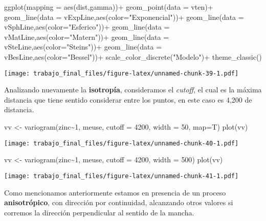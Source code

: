 \documentclass[
  12pt,
]{article}
\newenvironment{Shaded}{\begin{snugshade}}{\end{snugshade}}
\newcommand{\AttributeTok}[1]{\textcolor[rgb]{0.77,0.63,0.00}{#1}}
\newcommand{\DecValTok}[1]{\textcolor[rgb]{0.00,0.00,0.81}{#1}}
\newcommand{\FunctionTok}[1]{\textcolor[rgb]{0.00,0.00,0.00}{#1}}
\newcommand{\NormalTok}[1]{#1}
\newcommand{\OtherTok}[1]{\textcolor[rgb]{0.56,0.35,0.01}{#1}}
\newcommand{\SpecialCharTok}[1]{\textcolor[rgb]{0.00,0.00,0.00}{#1}}
\newcommand{\StringTok}[1]{\textcolor[rgb]{0.31,0.60,0.02}{#1}}
\begin{document}
\begin{Shaded}
\begin{Highlighting}[]
\FunctionTok{ggplot}\NormalTok{(}\AttributeTok{mapping =} \FunctionTok{aes}\NormalTok{(dist,gamma))}\SpecialCharTok{+}
  \FunctionTok{geom\_point}\NormalTok{(}\AttributeTok{data =}\NormalTok{ vten)}\SpecialCharTok{+}
  \FunctionTok{geom\_line}\NormalTok{(}\AttributeTok{data =}\NormalTok{ vExpLine,}\FunctionTok{aes}\NormalTok{(}\AttributeTok{color=}\StringTok{"Exponencial"}\NormalTok{))}\SpecialCharTok{+}
  \FunctionTok{geom\_line}\NormalTok{(}\AttributeTok{data =}\NormalTok{ vSphLine,}\FunctionTok{aes}\NormalTok{(}\AttributeTok{color=}\StringTok{"Esferico"}\NormalTok{))}\SpecialCharTok{+}
  \FunctionTok{geom\_line}\NormalTok{(}\AttributeTok{data =}\NormalTok{ vMatLine,}\FunctionTok{aes}\NormalTok{(}\AttributeTok{color=}\StringTok{"Matern"}\NormalTok{))}\SpecialCharTok{+}
  \FunctionTok{geom\_line}\NormalTok{(}\AttributeTok{data =}\NormalTok{ vSteLine,}\FunctionTok{aes}\NormalTok{(}\AttributeTok{color=}\StringTok{"Stein\textquotesingle{}s"}\NormalTok{))}\SpecialCharTok{+}
  \FunctionTok{geom\_line}\NormalTok{(}\AttributeTok{data =}\NormalTok{ vBesLine,}\FunctionTok{aes}\NormalTok{(}\AttributeTok{color=}\StringTok{"Bessel"}\NormalTok{))}\SpecialCharTok{+}
  \FunctionTok{scale\_color\_discrete}\NormalTok{(}\StringTok{"Modelo"}\NormalTok{)}\SpecialCharTok{+}
  \FunctionTok{theme\_classic}\NormalTok{()}
\end{Highlighting}
\end{Shaded}

\texttt{[image: trabajo\_final\_files/figure-latex/unnamed-chunk-39-1.pdf]}

Analizando nuevamente la \textbf{isotropía}, consideramos el
\emph{cutoff}, el cual es la máxima distancia que tiene sentido
considerar entre los puntos, en este caso es 4,200 de distancia.

\begin{Shaded}
\begin{Highlighting}[]
\NormalTok{vv }\OtherTok{\textless{}{-}} \FunctionTok{variogram}\NormalTok{(zinc}\SpecialCharTok{\textasciitilde{}}\DecValTok{1}\NormalTok{, meuse, }\AttributeTok{cutoff =} \DecValTok{4200}\NormalTok{, }\AttributeTok{width =} \DecValTok{50}\NormalTok{, }\AttributeTok{map=}\NormalTok{T)}
\FunctionTok{plot}\NormalTok{(vv)}
\end{Highlighting}
\end{Shaded}

\texttt{[image: trabajo\_final\_files/figure-latex/unnamed-chunk-40-1.pdf]}

\begin{Shaded}
\begin{Highlighting}[]
\NormalTok{vv }\OtherTok{\textless{}{-}} \FunctionTok{variogram}\NormalTok{(zinc}\SpecialCharTok{\textasciitilde{}}\DecValTok{1}\NormalTok{, meuse, }\AttributeTok{cutoff =} \DecValTok{4200}\NormalTok{, }\AttributeTok{width =} \DecValTok{500}\NormalTok{)}
\FunctionTok{plot}\NormalTok{(vv)}
\end{Highlighting}
\end{Shaded}

\texttt{[image: trabajo\_final\_files/figure-latex/unnamed-chunk-41-1.pdf]}

Como mencionamos anteriormente estamos en presencia de un proceso
\textbf{anisotrópico}, con dirección por continuidad, alcanzando otros
valores si corremos la dirección perpendicular al sentido de la mancha.
\end{document}
